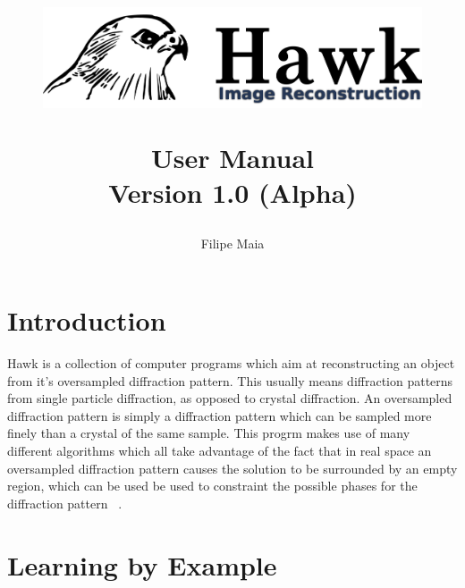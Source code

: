 \documentclass{report}
\begin{document}
\title{
\begin{figure}[!h]
\centering
\includegraphics[width=15cm]{Hawk2.png}
\label{hawk-cover}
\end{figure}
\vspace {1.0in}
{User Manual} \\ Version 1.0 (Alpha) }
\author {Filipe Maia}

\maketitle

\parindent=0pt 
\baselineskip=18pt 
\lineskip=0pt

\tableofcontents

\pagestyle{headings}

\def\delfo{$\delta_{fo}$~}
\def\delfc{$\delta_{fc}$~}
\def\qq{\qquad\qquad}
\def\hbar{\overline{h}}



\chapter{Introduction} 
\label{intro}

\vspace {0.1in}

Hawk is a collection of computer programs which aim at reconstructing an object from 
it's oversampled  diffraction pattern. This usually means diffraction patterns from 
single particle diffraction, as opposed to crystal diffraction. An oversampled diffraction
 pattern is simply a diffraction pattern which can be sampled more finely than a crystal
 of the same sample. This progrm makes use of many different algorithms which all take
 advantage of the fact that in real space an oversampled diffraction pattern causes 
the solution to be surrounded by an empty region, which can be used be used to 
constraint the possible phases for the diffraction pattern ~\cite{Miao2000}.

\chapter{Learning by Example}
\label{tutorial}
\end{document}
